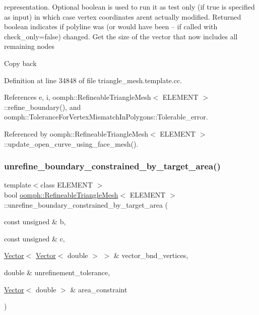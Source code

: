 representation. Optional boolean is used to run it as test only (if true is specified as input) in which case vertex coordinates aren\textquotesingle{}t actually modified. Returned boolean indicates if polyline was (or would have been -- if called with check\+\_\+only=false) changed. Get the size of the vector that now includes all remaining nodes

Copy back 

Definition at line 34848 of file triangle\+\_\+mesh.\+template.\+cc.



References e, i, oomph\+::\+Refineable\+Triangle\+Mesh$<$ E\+L\+E\+M\+E\+N\+T $>$\+::refine\+\_\+boundary(), and oomph\+::\+Tolerance\+For\+Vertex\+Mismatch\+In\+Polygons\+::\+Tolerable\+\_\+error.



Referenced by oomph\+::\+Refineable\+Triangle\+Mesh$<$ E\+L\+E\+M\+E\+N\+T $>$\+::update\+\_\+open\+\_\+curve\+\_\+using\+\_\+face\+\_\+mesh().

\mbox{\label{classoomph_1_1RefineableTriangleMesh_ad06aa82d81a16d5948b4317608a67aae}} 
\subsubsection{\texorpdfstring{unrefine\+\_\+boundary\+\_\+constrained\+\_\+by\+\_\+target\+\_\+area()}{unrefine\_boundary\_constrained\_by\_target\_area()}}
{\footnotesize\ttfamily template$<$class E\+L\+E\+M\+E\+NT $>$ \\
bool \hyperlink{classoomph_1_1RefineableTriangleMesh}{oomph\+::\+Refineable\+Triangle\+Mesh}$<$ E\+L\+E\+M\+E\+NT $>$\+::unrefine\+\_\+boundary\+\_\+constrained\+\_\+by\+\_\+target\+\_\+area (\begin{DoxyParamCaption}\item[{const unsigned \&}]{b,  }\item[{const unsigned \&}]{c,  }\item[{\hyperlink{classoomph_1_1Vector}{Vector}$<$ \hyperlink{classoomph_1_1Vector}{Vector}$<$ double $>$ $>$ \&}]{vector\+\_\+bnd\+\_\+vertices,  }\item[{double \&}]{unrefinement\+\_\+tolerance,  }\item[{\hyperlink{classoomph_1_1Vector}{Vector}$<$ double $>$ \&}]{area\+\_\+constraint }\end{DoxyParamCaption})\hspace{0.3cm}{\ttfamily [protected]}}



